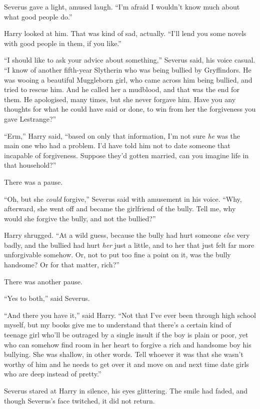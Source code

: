 Severus gave a light, amused laugh. ``I'm afraid I wouldn't know much
about what good people do.''

Harry looked at him. That was kind of sad, actually. ``I'll lend you
some novels with good people in them, if you like.''

``I should like to ask your advice about something,'' Severus said, his
voice casual. ``I know of another fifth-year Slytherin who was being
bullied by Gryffindors. He was wooing a beautiful Muggleborn girl, who
came across him being bullied, and tried to rescue him. And he called
her a mudblood, and that was the end for them. He apologised, many
times, but she never forgave him. Have you any thoughts for what he
could have said or done, to win from her the forgiveness you gave
Lestrange?''

``Erm,'' Harry said, ``based on only that information, I'm not sure
\emph{he} was the main one who had a problem. I'd have told him not to
date someone that incapable of forgiveness. Suppose they'd gotten
married, can you imagine life in that household?''

There was a pause.

``Oh, but she \emph{could} forgive,'' Severus said with amusement in his
voice. ``Why, afterward, she went off and became the girlfriend of the
bully. Tell me, why would she forgive the bully, and not the bullied?''

Harry shrugged. ``At a wild guess, because the bully had hurt someone
\emph{else} very badly, and the bullied had hurt \emph{her} just a
little, and to her that just felt far more unforgivable somehow. Or, not
to put too fine a point on it, was the bully handsome? Or for that
matter, rich?''

There was another pause.

``Yes to both,'' said Severus.

``And there you have it,'' said Harry. ``Not that I've ever been through
high school myself, but my books give me to understand that there's a
certain kind of teenage girl who'll be outraged by a single insult if
the boy is plain or poor, yet who can somehow find room in her heart to
forgive a rich and handsome boy his bullying. She was shallow, in other
words. Tell whoever it was that she wasn't worthy of him and he needs to
get over it and move on and next time date girls who are deep instead of
pretty.''

Severus stared at Harry in silence, his eyes glittering. The smile had
faded, and though Severus's face twitched, it did not return.


